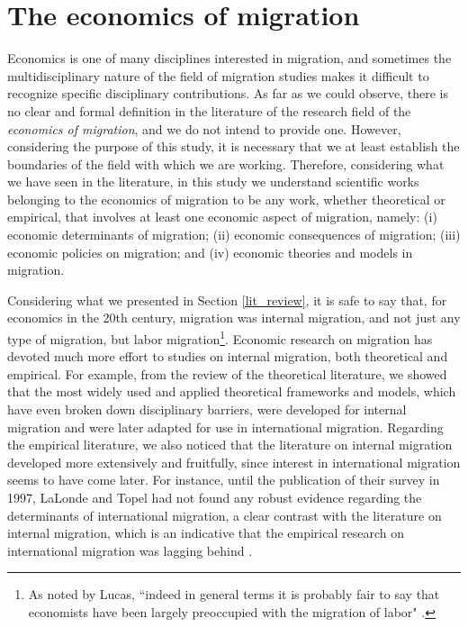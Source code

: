 \section{The economics of migration} \label{eco_migration}

Economics is one of many disciplines interested in migration, and sometimes the multidisciplinary nature of the field of migration studies makes it difficult to recognize specific disciplinary contributions. As far as we could observe, there is no clear and formal definition in the literature of the research field of the \textit{economics of migration}, and we do not intend to provide one. However, considering the purpose of this study, it is necessary that we at least establish the boundaries of the field with which we are working. Therefore, considering what we have seen in the literature, in this study we understand scientific works belonging to the economics of migration to be any work, whether theoretical or empirical, that involves at least one economic aspect of migration, namely: (i) economic determinants of migration; (ii) economic consequences of migration; (iii) economic policies on migration; and (iv) economic theories and models in migration.

Considering what we presented in Section \ref{lit_review}, it is safe to say that, for economics in the 20th century, migration was internal migration, and not just any type of migration, but labor migration\footnote{As noted by Lucas, ``indeed in general terms it is probably fair to say that economists have been largely preoccupied with the migration of labor" \citep[p. 786]{lucas_internal_1997}.}. Economic research on migration has devoted much more effort to studies on internal migration, both theoretical and empirical. For example, from the review of the theoretical literature, we showed that the most widely used and applied theoretical frameworks and models, which have even broken down disciplinary barriers, were developed for internal migration and were later adapted for use in international migration. Regarding the empirical literature, we also noticed that the literature on internal migration developed more extensively and fruitfully, since interest in international migration seems to have come later. For instance, until the publication of their survey in 1997, LaLonde and Topel had not found any robust evidence regarding the determinants of international migration, a clear contrast with the literature on internal migration, which is an indicative that the empirical research on international migration was lagging behind \citep{lalonde_economic_1997}.

